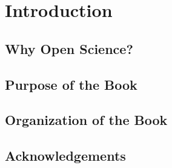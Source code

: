 \chapter{Introduction}

\section{Why Open Science?}

\section{Purpose of the Book}

\section{Organization of the Book}

\section{Acknowledgements}


